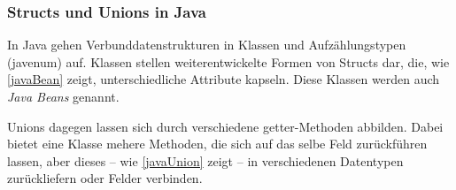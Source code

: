 \subsubsection*{Structs und Unions in Java}

In Java gehen Verbunddatenstrukturen in Klassen und Aufzählungstypen (jav{enum}) auf. Klassen stellen weiterentwickelte Formen von Structs dar, die, wie \autoref{javaBean} zeigt, unterschiedliche Attribute kapseln. Diese Klassen werden auch \textit{Java Beans} genannt. 


Unions dagegen lassen sich durch verschiedene getter-Methoden abbilden. Dabei bietet eine Klasse mehere Methoden, die sich auf das selbe Feld zurückführen lassen, aber dieses -- wie \autoref{javaUnion} zeigt -- in verschiedenen Datentypen zurückliefern oder Felder verbinden. 

